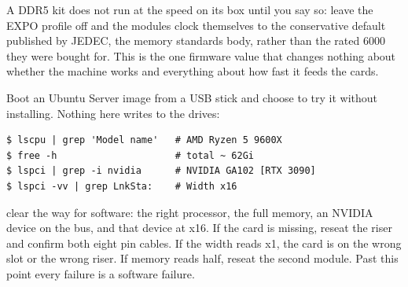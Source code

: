  A DDR5 kit does not run at the
speed on its box until you say so: leave the EXPO profile off and the modules clock
themselves to the conservative default published by JEDEC, the memory standards
body, rather than the rated 6000 they were bought for. This is the one firmware
value that changes nothing about whether the machine works and everything about how
fast it feeds the cards.


 Boot an Ubuntu Server image from a
USB stick and choose to try it without installing. Nothing here writes to the
drives:

\begin{verbatim}
$ lscpu | grep 'Model name'   # AMD Ryzen 5 9600X
$ free -h                     # total ~ 62Gi
$ lspci | grep -i nvidia      # NVIDIA GA102 [RTX 3090]
$ lspci -vv | grep LnkSta:    # Width x16
\end{verbatim}


 clear the way for software: the right processor, the
full memory, an NVIDIA device on the bus, and that device at x16. If the card is
missing, reseat the riser and confirm both eight pin cables. If the width reads x1,
the card is on the wrong slot or the wrong riser. If memory reads half, reseat the
second module. Past this point every failure is a software failure.



